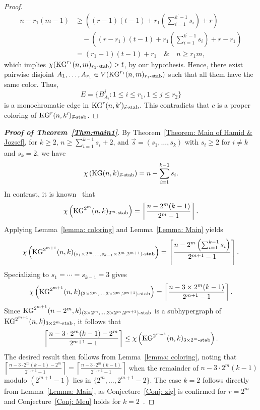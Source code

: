 \documentclass[preprint,12pt,3p]{elsarticle}
\begin{document}
\begin{proof}
\begin{align*}
  n-r_1(m-1) & \geq \left((r-1)(t-1)+r_1\left(\sum_{i=1}^{k^{\prime}-1}s_i\right)+ r\right) \\
  & \quad - \left((r-r_1)(t-1)+r_1\left(\sum_{i=1}^{k^{\prime}-1}s_i\right)+r-r_1\right) \\
  & = (r_1-1)(t-1)+r_1 \quad \& \quad n\geq r_1m,
\end{align*}
which implies $\chi(\mathrm{KG}^{r_1}(n,m)_{r_1\textup{-stab}}) > t$, by our hypothesis. Hence, there exist pairwise disjoint $A_1, \ldots , A_{r_1}\in V(\mathrm{KG}^{r_1}(n,m)_{r_1\textup{-stab}})$ such that all them have the same color. Thus,
\[
E=\{B_{A_i}^{j} : 1\leq i\leq r_1, 1\leq j\leq r_2 \}
\] 
is a monochromatic edge in $\mathrm{KG}^{r}(n,k^{\prime})_{\vec{s}\textup{-stab}}$. This contradicts that $c$ is a proper coloring of $\mathrm{KG}^{r}(n,k^{\prime})_{\vec{s}\textup{-stab}}$. 
\end{proof}

\begin{proof}[\textbf{Proof of Theorem~\ref{Thm:main1}}]
By Theorem~\ref{Theorem: Main of Hamid & Jozsef}, for $k\geq 2$, $n\geq\sum_{i=1}^{k-1}s_i+2$, and $\vec{s}=(s_1, \ldots, s_k)$ with $s_i\geq2$ for $i\neq k$ and $s_k=2$, we have
\[
\chi\left(\mathrm{KG}(n, k)_{\vec{s}\textup{-stab}}\right)= n-\sum_{i=1}^{k-1}s_i.
\]
In contrast, it is known~\cite{Alon2009} that
\[
\chi\left(\mathrm{KG}^{2^{m}}(n,k)_{2^{m}\textup{-stab}}\right)= \left\lceil\frac{n-2^{m}(k-1)}{2^m-1}\right\rceil.
\]
Applying Lemma~\ref{lemma: coloring} and Lemma~\ref{Lemma: Main} yields
\[
\chi \left(\mathrm{KG}^{2^{m+1}}(n,k)_{(s_1\times 2^{m},\ldots,s_{k-1}\times 2^{m}, 2^{m+1})\textup{-stab}}\right)=\left\lceil\frac{n-2^{m}\left(\sum_{i=1}^{k-1}s_i\right)}{2^{m+1}-1}\right\rceil.
\]
Specializing to $s_1=\cdots=s_{k-1}=3$ gives
\[
\chi \left(\mathrm{KG}^{2^{m+1}}(n,k)_{(3\times 2^{m},\ldots,3\times 2^{m}, 2^{m+1})\textup{-stab}}\right)=\left\lceil\frac{n-3\times 2^{m}(k-1)}{2^{m+1}-1}\right\rceil.
\]
Since $\mathrm{KG}^{2^{m+1}}(n-2^m,k)_{(3\times 2^{m},\ldots,3\times 2^{m}, 2^{m+1})\textup{-stab}}$ is a subhypergraph of $\mathrm{KG}^{2^{m+1}}(n,k)_{3\times 2^{m}\textup{-stab}}$, it follows that
\[
\left\lceil\frac{n-3\cdot 2^{m}(k-1)-2^{m}}{2^{m+1}-1}\right\rceil \leq \chi\left(\mathrm{KG}^{2^{m+1}}(n,k)_{3\times 2^{m}\textup{-stab}}\right).
\]
The desired result then follows from Lemma~\ref{lemma: coloring}, noting that $\left\lceil\frac{n-3\cdot 2^{m}(k-1)-2^{m}}{2^{m+1}-1}\right\rceil = \left\lceil\frac{n-3\cdot 2^{m}(k-1)}{2^{m+1}-1}\right\rceil$ when the remainder of $n-3\cdot 2^{m}(k-1)$ modulo $(2^{m+1}-1)$ lies in $\{2^m, \ldots, 2^{m+1}-2\}$. The case $k=2$ follows directly from Lemma~\ref{Lemma: Main}, as Conjecture~\ref{Conj: zig} is confirmed for $r=2^m$~\cite{Alon2009} and Conjecture~\ref{Conj: Meu} holds for $k=2$~\cite{daneshpajouh2021colorings}.
\end{proof}
\end{document}
